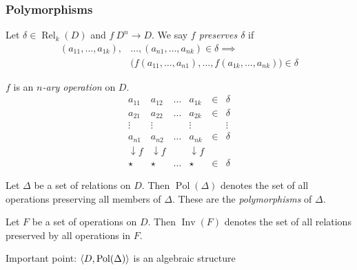 \documentclass[12pt,xcolor=dvipsnames%
   ]{beamer}
\DeclareMathOperator{\Rel}{Rel}
\newcommand{\bigpause}{\pause\bigskip}
\DeclareMathOperator{\Pol}{Pol}
\DeclareMathOperator{\Inv}{Inv}
\renewcommand{\.}{\cdot}
\begin{document}
\begin{frame}
  \frametitle{Polymorphisms}

  \begin{definition}
    Let $\delta \in \Rel_k(D)$ and $f\: D^n \to D$. We say 
    \emph{$f$ preserves $\delta$} if
    \begin{equation*}
      \begin{split}
        (a_{11}, \dots, a_{1k}),&\dots, (a_{n1},\dots, a_{nk}) \in
        \delta \implies\\ 
        &\bigl( f(a_{11},\dots, a_{n1}), \dots, f(a_{1k},\dots,a_{nk})
        \bigr) \in \delta
    \end{split}
    \end{equation*}

  \end{definition}

  \begin{overprint}
  $f$ is an \emph{$n$-ary operation} on $D$.
    \begin{equation*}
      \newcommand\flab{\scriptstyle{f}}
      \begin{matrix} a_{11} & a_{12} & \dots & a_{1k} & \in & \delta \\
        a_{21} & a_{22} & \dots & a_{2k} & \in & \delta \\
        \vdots  & \vdots &       &\vdots  &     & \vdots \\
        a_{n1} & a_{n2} & \dots & a_{nk} & \in & \delta \\
        \downarrow\flab &\downarrow\flab &  & \downarrow\flab \\
        \star  & \star  & \dots & \star  & \in & \delta
      \end{matrix}
    \end{equation*}
  \end{overprint}
\end{frame}

\begin{frame}
  \begin{definition}
    Let $\Delta$ be a set of relations on $D$. Then
    \emph{$\Pol(\Delta)$} denotes the set of all operations preserving
    all members of $\Delta$. These are the \emph{polymorphisms} of
    $\Delta$. 

    \bigpause

    Let $F$ be a set of operations on $D$. Then \emph{$\Inv(F)$} denotes
    the set of all relations preserved by all operations in $F$.
  \end{definition}
  
  \bigpause
Important point: $\<D,\Pol(\Delta)\>$ is an algebraic structure

\end{frame}
\end{document}
